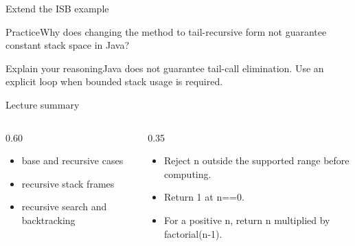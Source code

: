 \documentclass[10pt,aspectratio=169]{beamer}
\begin{document}
\begin{frame}[fragile,t]{Extend the ISB example}
\begin{alertblock}{Practice}Why does changing the method to tail{-}recursive form not guarantee constant stack space in Java?\end{alertblock}\vspace{3mm}\begin{exampleblock}{Explain your reasoning}Java does not guarantee tail{-}call elimination. Use an explicit loop when bounded stack usage is required.\end{exampleblock}
\end{frame}
\begin{frame}[fragile,t]{Lecture summary}
\begin{columns}[T,onlytextwidth]\begin{column}{0.60\textwidth}
\begin{itemize}
\item base and recursive cases
\item recursive stack frames
\item recursive search and backtracking
\end{itemize}
\end{column}\begin{column}{0.35\textwidth}\small
\begin{itemize}
\item Reject n outside the supported range before computing.
\item Return 1 at n==0.
\item For a positive n, return n multiplied by factorial(n-1).
\end{itemize}
\end{column}\end{columns}
\end{frame}
\end{document}
